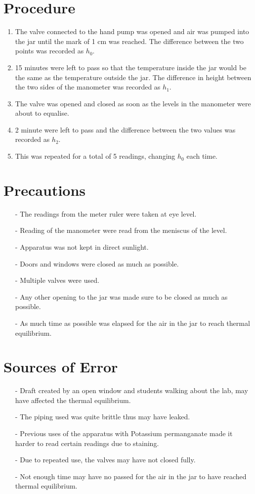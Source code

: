 \documentclass[12pt, a4paper]{article}
\begin{document}
\section*{Procedure}
\begin{enumerate}
    \item The valve connected to the hand pump was opened and air was pumped into the jar until the mark of 1 cm was reached. The difference between the two points was recorded as $h_0$.
    \item 15 minutes were left to pass so that the temperature inside the jar would be the same as the temperature outside the jar. The difference in height between the two sides of the manometer was recorded as $h_1$.
    \item The valve was opened and closed as soon as the levels in the manometer were about to equalise. 
    \item 2 minute were left to pass and the difference between the two values was recorded as $h_2$.
    \item This was repeated for a total of 5 readings, changing $h_0$ each time.
\end{enumerate}

\section*{Precautions}
\begin{itemize}
    \item[-] The readings from the meter ruler were taken at eye level.
    \item[-] Reading of the manometer were read from the meniscus of the level.
    \item[-] Apparatus was not kept in direct sunlight.
    \item[-] Doors and windows were closed as much as possible.
    \item[-] Multiple valves were used.
    \item[-] Any other opening to the jar was made sure to be closed as much as possible.
    \item[-] As much time as possible was elapsed for the air in the jar to reach thermal equilibrium. 
\end{itemize}

\section*{Sources of Error}
\begin{itemize}
    \item[-] Draft created by an open window and students walking about the lab, may have affected the thermal equilibrium.
    \item[-] The piping used was quite brittle thus may have leaked.
    \item[-] Previous uses of the apparatus with Potassium permanganate made it harder to read certain readings due to staining.
    \item[-] Due to repeated use, the valves may have not closed fully.
    \item[-] Not enough time may have no passed for the air in the jar to have reached thermal equilibrium. 
\end{itemize}
\end{document}
